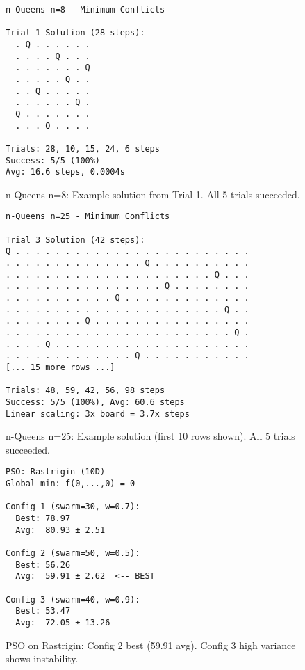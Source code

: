 \documentclass[letterpaper]{article}
\begin{document}
\begin{figure}[h]
\begin{scriptsize}
\begin{verbatim}
n-Queens n=8 - Minimum Conflicts

Trial 1 Solution (28 steps):
  . Q . . . . . .
  . . . . Q . . .
  . . . . . . . Q
  . . . . . Q . .
  . . Q . . . . .
  . . . . . . Q .
  Q . . . . . . .
  . . . Q . . . .

Trials: 28, 10, 15, 24, 6 steps
Success: 5/5 (100%)
Avg: 16.6 steps, 0.0004s
\end{verbatim}
\end{scriptsize}
\caption{n-Queens n=8: Example solution from Trial 1. All 5 trials succeeded.}
\label{fig:nqueens-8}
\end{figure}

\begin{figure}[h]
\begin{scriptsize}
\begin{verbatim}
n-Queens n=25 - Minimum Conflicts

Trial 3 Solution (42 steps):
Q . . . . . . . . . . . . . . . . . . . . . . . .
. . . . . . . . . . . . . . Q . . . . . . . . . .
. . . . . . . . . . . . . . . . . . . . . Q . . .
. . . . . . . . . . . . . . . . Q . . . . . . . .
. . . . . . . . . . . Q . . . . . . . . . . . . .
. . . . . . . . . . . . . . . . . . . . . . Q . .
. . . . . . . . Q . . . . . . . . . . . . . . . .
. . . . . . . . . . . . . . . . . . . . . . . Q .
. . . . Q . . . . . . . . . . . . . . . . . . . .
. . . . . . . . . . . . . Q . . . . . . . . . . .
[... 15 more rows ...]

Trials: 48, 59, 42, 56, 98 steps
Success: 5/5 (100%), Avg: 60.6 steps
Linear scaling: 3x board = 3.7x steps
\end{verbatim}
\end{scriptsize}
\caption{n-Queens n=25: Example solution (first 10 rows shown). All 5 trials succeeded.}
\label{fig:nqueens-25}
\end{figure}

\begin{figure}[h]
\begin{scriptsize}
\begin{verbatim}
PSO: Rastrigin (10D)
Global min: f(0,...,0) = 0

Config 1 (swarm=30, w=0.7):
  Best: 78.97
  Avg:  80.93 ± 2.51

Config 2 (swarm=50, w=0.5):
  Best: 56.26
  Avg:  59.91 ± 2.62  <-- BEST

Config 3 (swarm=40, w=0.9):
  Best: 53.47
  Avg:  72.05 ± 13.26
\end{verbatim}
\end{scriptsize}
\caption{PSO on Rastrigin: Config 2 best (59.91 avg). Config 3 high variance shows instability.}
\label{fig:pso-rastrigin}
\end{figure}
\end{document}
